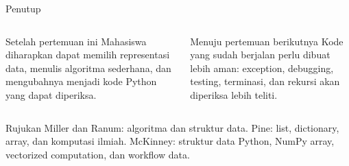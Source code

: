 \documentclass[aspectratio=169,11pt]{beamer}
\begin{document}
\begin{frame}{Penutup}
\begin{columns}[T]
\begin{block}{Setelah pertemuan ini}
Mahasiswa diharapkan dapat memilih representasi data, menulis algoritma sederhana, dan mengubahnya menjadi kode Python yang dapat diperiksa.
\end{block}
\begin{block}{Menuju pertemuan berikutnya}
Kode yang sudah berjalan perlu dibuat lebih aman: exception, debugging, testing, terminasi, dan rekursi akan diperiksa lebih teliti.
\end{block}
\end{columns}
\vspace{2mm}
\begin{block}{Rujukan}
Miller dan Ranum: algoritma dan struktur data. Pine: list, dictionary, array, dan komputasi ilmiah. McKinney: struktur data Python, NumPy array, vectorized computation, dan workflow data.
\end{block}
\end{frame}
\end{document}
